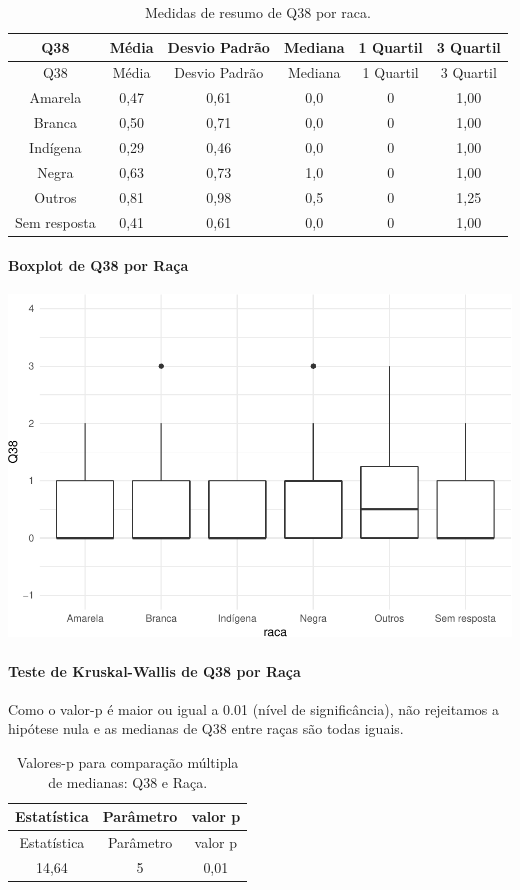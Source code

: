 \documentclass[]{article}
\let\oldparagraph\paragraph
\renewcommand{\paragraph}[1]{\oldparagraph{#1}\mbox{}}
\begin{document}
\begin{longtable}[]{@{}cccccc@{}}
\caption{\label{tab:unnamed-chunk-1462}Medidas de resumo de Q38 por raca.}\tabularnewline
\toprule
Q38 & Média & Desvio Padrão & Mediana & 1 Quartil & 3 Quartil\tabularnewline
\midrule
\endfirsthead
\toprule
Q38 & Média & Desvio Padrão & Mediana & 1 Quartil & 3 Quartil\tabularnewline
\midrule
\endhead
Amarela & 0,47 & 0,61 & 0,0 & 0 & 1,00\tabularnewline
Branca & 0,50 & 0,71 & 0,0 & 0 & 1,00\tabularnewline
Indígena & 0,29 & 0,46 & 0,0 & 0 & 1,00\tabularnewline
Negra & 0,63 & 0,73 & 1,0 & 0 & 1,00\tabularnewline
Outros & 0,81 & 0,98 & 0,5 & 0 & 1,25\tabularnewline
Sem resposta & 0,41 & 0,61 & 0,0 & 0 & 1,00\tabularnewline
\bottomrule
\end{longtable}

\hypertarget{boxplot-de-q38-por-rauxe7a}{%
\paragraph{Boxplot de Q38 por Raça}\label{boxplot-de-q38-por-rauxe7a}}

\begin{center}\includegraphics[width=0.75\linewidth]{relatorio_covid19_files/figure-latex/unnamed-chunk-1463-1} \end{center}

\hypertarget{teste-de-kruskal-wallis-de-q38-por-rauxe7a}{%
\paragraph{Teste de Kruskal-Wallis de Q38 por Raça}\label{teste-de-kruskal-wallis-de-q38-por-rauxe7a}}

Como o valor-p é maior ou igual a 0.01 (nível de significância), não rejeitamos a hipótese nula e as medianas de Q38 entre raças são todas iguais.

\begin{longtable}[]{@{}ccc@{}}
\caption{\label{tab:unnamed-chunk-1465}Valores-p para comparação múltipla de medianas: Q38 e Raça.}\tabularnewline
\toprule
Estatística & Parâmetro & valor p\tabularnewline
\midrule
\endfirsthead
\toprule
Estatística & Parâmetro & valor p\tabularnewline
\midrule
\endhead
14,64 & 5 & 0,01\tabularnewline
\bottomrule
\end{longtable}
\end{document}
